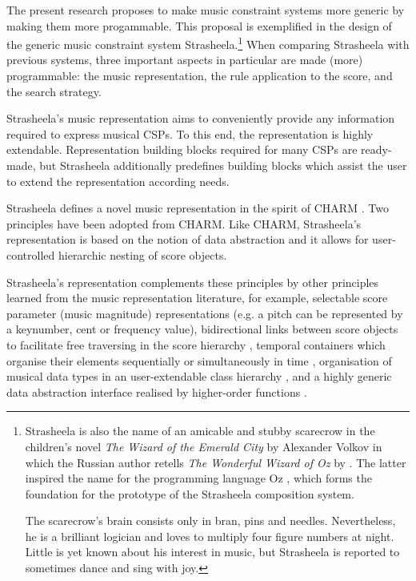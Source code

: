 \documentclass{scrartcl}
\begin{document}
The present research proposes to make music constraint systems more generic by making them more progammable. This proposal is exemplified in the design of the generic music constraint system Strasheela.\footnote{Strasheela is also the name of an amicable and stubby scarecrow in the children's novel \emph{The Wizard of the Emerald City} by Alexander Volkov \citep{Wolkow:Smaragdenstadt} in which the Russian author retells \emph{The Wonderful Wizard of Oz} by \citet{Baum:WizardOfOz}. The latter inspired the name for the programming language Oz \citep{Roy:OzBook}, which forms the foundation for the prototype of the Strasheela composition system. 

The scarecrow's brain consists only in bran, pins and needles. Nevertheless, he is a brilliant logician and loves to multiply four figure numbers at night. Little is yet known about his interest in music, but Strasheela is reported to sometimes dance and sing with joy.} 
When comparing Strasheela with previous systems, three important aspects in particular are made (more) programmable: the music representation, the rule application to the score, and the search strategy.



Strasheela's music representation aims to conveniently provide any information required to express musical CSPs. To this end, the representation is highly extendable. Representation building blocks required for many CSPs are ready-made, but Strasheela additionally predefines building blocks which assist the user to extend the representation according needs. 


Strasheela defines a novel music representation in the spirit of CHARM \citep{harris91representing}. Two principles have been adopted from CHARM. Like CHARM, Strasheela's representation is based on the notion of data abstraction \citep{AbelsonAndSussman:SICP:1985} and it allows for user-controlled hierarchic nesting of score objects. 

Strasheela's representation complements these principles by other principles learned from the music representation literature, for example, selectable score parameter (music magnitude) representations \citep{Pope:SmOKe} (e.g. a pitch can be represented by a keynumber, cent or frequency value), bidirectional links between score objects to facilitate free traversing in the score hierarchy \citep{Laurson:PhD:1996}, temporal containers which organise their elements sequentially or simultaneously in time \citep{Dannenberg:Score:1989}, organisation of musical data types in an user-extendable class hierarchy \citep{Pope:OO:1991,Desain:Honing:CLOSe:1997}, and a highly generic data abstraction interface realised by higher-order functions \citep{Desain:90}. 
\end{document}
